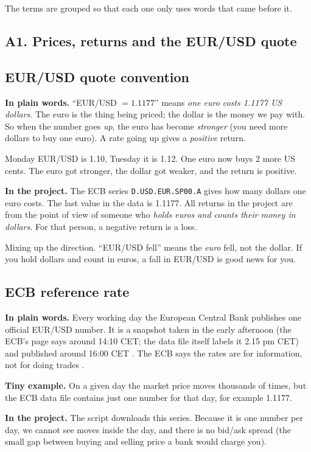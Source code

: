 \documentclass[11pt,a4paper]{article}
\newcommand{\term}[1]{\subsection{#1}}
\newcommand{\plain}{\textbf{In plain words.} }
\newcommand{\inproj}{\textbf{In the project.} }
\newcommand{\tinyex}{\textbf{Tiny example.} }
\newcommand{\code}[1]{\texttt{#1}}
\begin{document}
The terms are grouped so that each one only uses words that came before it.

\subsection*{A1. Prices, returns and the EUR/USD quote}

\term{EUR/USD quote convention}\label{g:quote}
\plain ``EUR/USD $= 1.1177$'' means \emph{one euro costs 1.1177 US dollars}.
The euro is the thing being priced; the dollar is the money we pay with.
So when the number goes \emph{up}, the euro has become \emph{stronger}
(you need more dollars to buy one euro). A rate going up gives a
\emph{positive} return.

\begin{example}
Monday EUR/USD is 1.10, Tuesday it is 1.12. One euro now buys 2 more US
cents. The euro got stronger, the dollar got weaker, and the return is
positive.
\end{example}

\inproj The ECB series \code{D.USD.EUR.SP00.A} gives how many dollars one
euro costs. The last value in the data is 1.1177. All returns in the project
are from the point of view of someone who \emph{holds euros and counts their
money in dollars}. For that person, a negative return is a loss.

\begin{mistake}
Mixing up the direction. ``EUR/USD fell'' means the \emph{euro} fell, not the
dollar. If you hold dollars and count in euros, a fall in EUR/USD is good
news for you.
\end{mistake}

\term{ECB reference rate}\label{g:ecb}
\plain Every working day the European Central Bank publishes one official
EUR/USD number. It is a snapshot taken in the early afternoon (the ECB's
page says around 14:10 CET; the data file itself labels it 2.15 pm CET) and
published around 16:00 CET \citep{ecbrefrates}. The ECB says the rates are for information,
not for doing trades \citep{ecbrefrates}.

\tinyex On a given day the market price moves thousands of times, but the ECB
data file contains just one number for that day, for example 1.1177.

\inproj The script downloads this series. Because it is one number per day,
we cannot see moves inside the day, and there is no bid/ask spread (the
small gap between buying and selling price a bank would charge you).
\end{document}
